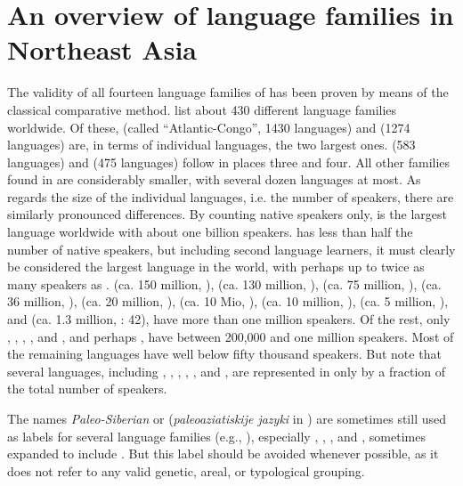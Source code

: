 \chapter{An overview of language families in Northeast Asia}

The validity of all fourteen language families of  has been proven by means of the classical comparative method. \citet{Hammarström2016} list about 430 different language families worldwide. Of these,  (called “Atlantic-Congo”, 1430 languages) and  (1274 languages) are, in terms of individual languages, the two largest ones.  (583 languages) and  (475 languages) follow in places three and four. All other families found in  are considerably smaller, with several dozen languages at most. As regards the size of the individual languages, i.e. the number of speakers, there are similarly pronounced differences. By counting native speakers only,  is the largest language worldwide with about one billion speakers.  has less than half the number of native speakers, but including second language learners, it must clearly be considered the largest language in the world, with perhaps up to twice as many speakers as .  (ca. 150 million, \citealt{Cubberley2002}),  (ca. 130 million, \citealt{Hasegawa2015}),  (ca. 75 million, \citealt{Song2005}),  (ca. 36 million, \citealt{Young2006}),  (ca. 20 million, \citealt{Johanson2006b}),  (ca. 10 Mio, \citealt{Muhamedowa2016}),  (ca. 10 million, \citealt{TuohutiLitifu2012}),  (ca. 5 million, \citealt{Janhunen2003}), and  (ca. 1.3 million, \citealt{Ebihara2011}: 42), have more than one million speakers. Of the rest, only , , , , and , and perhaps , have between 200,000 and one million speakers. Most of the remaining languages have well below fifty thousand speakers. But note that several languages, including , , , , , and , are represented in  only by a fraction of the total number of speakers.

The names \textit{Paleo-Siberian} or \textit{} (\textit{paleoaziatiskije jazyki} in ) are sometimes still used as labels for several language families (e.g., \citealt{TsumagariKurebitoEndo2007}), especially , , , and , sometimes expanded to include . But this label should be avoided whenever possible, as it does not refer to any valid genetic, areal, or typological grouping.

